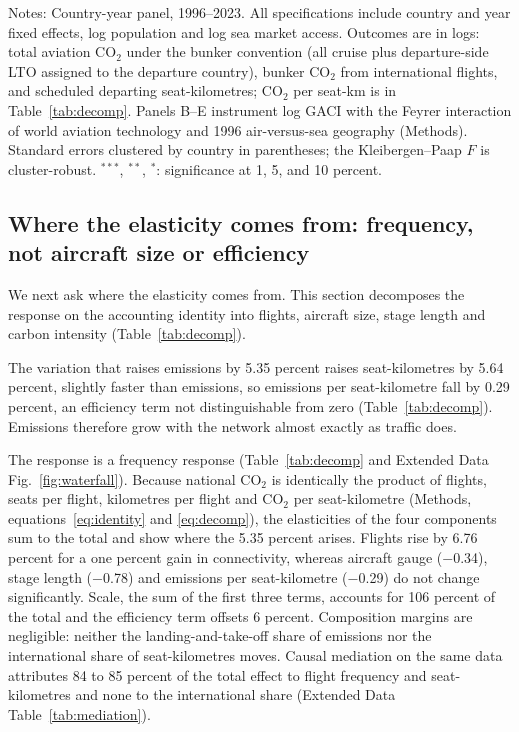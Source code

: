 \documentclass[12pt]{extarticle}
\begin{document}
\begin{table}[H]
{\begin{threeparttable}
\begin{tabular}{lccc}
\bottomrule
\end{tabular}
\begin{tablenotes}[flushleft]
\footnotesize
\item Notes: Country-year panel, 1996--2023. All specifications include country and year fixed effects, log population and log sea market access. Outcomes are in logs: total aviation CO$_2$ under the bunker convention (all cruise plus departure-side LTO assigned to the departure country), bunker CO$_2$ from international flights, and scheduled departing seat-kilometres; CO$_2$ per seat-km is in Table~\ref{tab:decomp}. Panels B--E instrument log GACI with the Feyrer interaction of world aviation technology and 1996 air-versus-sea geography (Methods). Standard errors clustered by country in parentheses; the Kleibergen--Paap $F$ is cluster-robust. $^{***}$, $^{**}$, $^{*}$: significance at 1, 5, and 10 percent.
\end{tablenotes}
\end{threeparttable}}
\end{table}

\subsection*{Where the elasticity comes from: frequency, not aircraft size
or efficiency}
We next ask where the elasticity comes from. This section decomposes the
response on the accounting identity into flights, aircraft size, stage
length and carbon intensity (Table~\ref{tab:decomp}).

The variation that raises emissions by 5.35 percent raises
seat-kilometres by 5.64 percent, slightly faster than emissions, so
emissions per seat-kilometre fall by 0.29 percent, an efficiency term not
distinguishable from zero (Table~\ref{tab:decomp}). Emissions therefore
grow with the network almost exactly as traffic does.

The response is a frequency response (Table~\ref{tab:decomp} and Extended
Data Fig.~\ref{fig:waterfall}). Because national CO$_2$ is identically the
product of flights, seats per flight, kilometres per flight and CO$_2$ per
seat-kilometre (Methods, equations~\ref{eq:identity} and
\ref{eq:decomp}), the elasticities of the four components sum to the
total and show where the 5.35 percent arises. Flights rise by 6.76 percent
for a one percent gain in connectivity, whereas aircraft gauge ($-$0.34),
stage length ($-$0.78) and emissions per seat-kilometre ($-$0.29) do not
change significantly. Scale, the sum of the first three terms, accounts
for 106 percent of the total and the efficiency term offsets 6 percent.
Composition margins are negligible: neither the landing-and-take-off
share of emissions nor the international share of seat-kilometres moves.
Causal mediation on the same data attributes 84 to 85 percent of the total
effect to flight frequency and seat-kilometres and none to the
international share (Extended Data Table~\ref{tab:mediation}).
\end{document}
